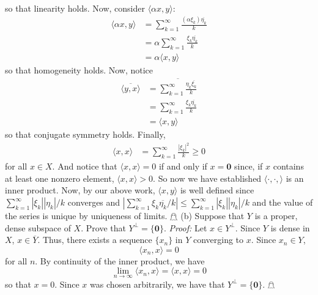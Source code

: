 \documentclass{article}
\begin{document}
\begin{itemize}
\begin{align*}
    \end{align*}
    so that linearity holds. Now, consider $\langle \alpha x, y\rangle$:
    \begin{align*}
        \langle \alpha x, y \rangle &= \sum_{k = 1}^{\infty} \frac{(\alpha\xi_k)\overline{\eta_k}}{k}\\
        &= \alpha \sum_{k = 1}^{\infty} \frac{\xi_k\overline{\eta_k}}{k}\\
        &= \alpha \langle x, y \rangle
    \end{align*}
    so that homogeneity holds. Now, notice
    \begin{align*}
        \overline{\langle y, x\rangle} &= \overline{\sum_{k = 1}^{\infty}\frac{\eta_k\overline{\xi_k}}{k}}\\
        &= \sum_{k = 1}^{\infty} \frac{\xi_k\overline{\eta_k}}{k}\\
        &= \langle x, y\rangle
    \end{align*}
    so that conjugate symmetry holds. Finally, 
    \begin{align*}
        \langle x, x\rangle &= \sum_{k = 1}^{\infty} \frac{|\xi_k|^2}{k} \geq 0
    \end{align*}
    for all $x \in X$. And notice that $\langle x, x\rangle = 0$ if and only if $x = \mathbf{0}$ since, if $x$ contains at least one nonzero element, $\langle x, x \rangle > 0$. So now we have established $\langle \cdot, \cdot, \rangle$ is an inner product. Now, by our above work, $\langle x, y\rangle$ is well defined since $\sum_{k = 1}^{\infty} |\xi_k||\eta_k|/k$ converges and $\left|\sum_{k = 1}^{\infty} \xi_k\overline{\eta_k}/k\right| \leq \sum_{k = 1}^{\infty} |\xi_k||\eta_k|/k$ and the value of the series is unique by uniqueness of limits. \hfill $\mathghost$
    \newline\newline
    (b) Suppose that $Y$ is a proper, dense subspace of $X$. Prove that $Y^{\perp} = \{\mathbf{0}\}$.
    \newline\newline
    \textit{Proof:} Let $x \in Y^{\perp}$. Since $Y$ is dense in $X$, $x \in \overline{Y}$. Thus, there exists a sequence $\{x_n\}$ in $Y$ converging to $x$. Since $x_n \in Y$, 
    \[\langle x_n, x\rangle = 0\]
    for all $n$. By continuity of the inner product, we have
    \[\lim_{n \to \infty} \langle x_n, x\rangle = \langle x, x\rangle = 0\]
    so that $x = 0$. Since $x$ was chosen arbitrarily, we have that $Y^{\perp} = \{\mathbf{0}\}$. \hfill $\mathghost$
    \newline\newline

\end{itemize}
\end{document}
